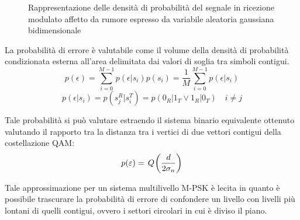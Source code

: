 \begin{figure}[ht]\centering{}
	\quad{}
	\caption{Rappresentazione delle densità di probabilità del segnale in ricezione modulato affetto da rumore espresso da variabile aleatoria gaussiana bidimensionale}
	\label{fig:var_aleatoria_gaussiana_bidimensionale}
\end{figure}

La probabilità di errore è valutabile come il volume della densità di probabilità condizionata esterna all'area delimitata dai valori di soglia tra simboli contigui.
\[p(\epsilon)=\sum_{i=0}^{M-1}p(\epsilon|s_i)p(s_i)=\frac{1}{M}\sum_{i=0}^{M-1}p(\epsilon|s_i)\]
\[p(\epsilon|s_i)=p(s_j^R|s_i^T)=p(0_R|1_T\vee 1_R|0_T)\quad i\neq j\]

Tale probabilità si può valutare estraendo il sistema binario equivalente ottenuto valutando il rapporto tra la distanza tra i vertici di due vettori contigui della costellazione \ac{QAM}:
\begin{equation}
p(\varepsilon)=\,{Q}^{}\!\left({\frac{d}{2\sigma_n}}\right)
\end{equation}

Tale approssimazione per un sistema multilivello M-\ac{PSK} è lecita in quanto è possibile trascurare la probabilità di errore di confondere un livello con livelli più lontani di quelli contigui, ovvero i settori circolari in cui è diviso il piano.

